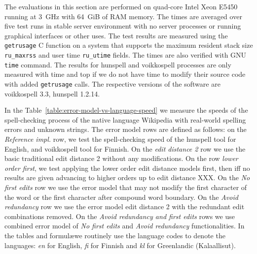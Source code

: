 \documentclass[11pt]{article}
\begin{document}
The evaluations in this section are performed on quad-core Intel Xeon E5450
running at 3~GHz with 64~GiB of RAM memory. The times are averaged over five
test runs in stable server environment with no server processes or running
graphical interfaces or other uses. The test results are measured using the
\texttt{getrusage} C function on a system that supports the maximum resident
stack size \texttt{ru\_maxrss} and user time \texttt{ru\_utime} fields. The times
are also verified with GNU \texttt{time} command. The results for hunspell and
voikkospell processes are only measured with time and top if we do not have
time to modify their source code with added \texttt{getrusage} calls. The
respective versions of the software are voikkospell 3.3, hunspell 1.2.14.

In the Table~\ref{table:error-model-vs-language-speed} we measure the speeds of
the spell-checking process of the native language Wikipedia with real-world
spelling errors and unknown strings. The error model rows are defined as
follows: on the \emph{Reference impl.} row, we test the spell-checking speed of
the hunspell tool for English, and voikkospell tool for Finnish. On the
\emph{edit distance 2} row we use the basic traditional edit distance 2 without
any modifications. On the row \emph{lower order first}, we test applying the
lower order edit distance models first, then iff no results are given advancing
to higher orders up to edit distance XXX. On the \emph{No first edits} row we
use the error model that may not modify the first character of the word or the
first character after compound word boundary. On the \emph{Avoid redundancy}
row we use the error model edit distance 2 with the redundant edit combinations
removed. On the \emph{Avoid redundancy and first edits} rows we use combined
error model of \emph{No first edits} and \emph{Avoid redundancy}
functionalities.  In the tables and formul\ae we routinely use the language
codes to denote the languages: \emph{en} for English, \emph{fi} for Finnish and
\emph{kl} for Greenlandic (Kalaallisut). 
\end{document}
